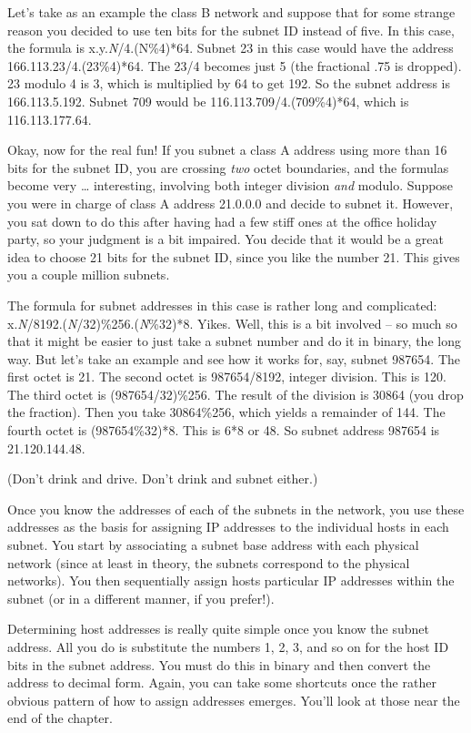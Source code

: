 \documentclass[b5paper,11pt]{memoir}
\begin{document}
Let's take as an example the class B network and suppose that for some
strange reason you decided to use ten bits for the subnet ID instead of
five. In this case, the formula is x.y.{\emph{N}}/4.(N\%4)*64. Subnet 23
in this case would have the address 166.113.23/4.(23\%4)*64. The 23/4
becomes just 5 (the fractional .75 is dropped). 23 modulo 4 is 3, which
is multiplied by 64 to get 192. So the subnet address is 166.113.5.192.
Subnet 709 would be 116.113.709/4.(709\%4)*64, which is 116.113.177.64.

Okay, now for the real fun! If you subnet a class A address using more
than 16 bits for the subnet ID, you are crossing {\emph{two}} octet
boundaries, and the formulas become very \ldots{} interesting, involving
both integer division {\emph{and}} modulo. Suppose you were in charge of
class A address 21.0.0.0 and decide to subnet it. However, you sat down
to do this after having had a few stiff ones at the office holiday
party, so your judgment is a bit impaired. You decide that it would be a
great idea to choose 21 bits for the subnet ID, since you like the
number 21. This gives you a couple million subnets.

The formula for subnet addresses in this case is rather long and
complicated: x.{\emph{N}}/8192.({\emph{N}}/32)\%256.({\emph{N}}\%32)*8.
Yikes. Well, this is a bit involved -- so much so that it might be easier
to just take a subnet number and do it in binary, the long way. But
let's take an example and see how it works for, say, subnet 987654. The
first octet is 21. The second octet is 987654/8192, integer division.
This is 120. The third octet is (987654/32)\%256. The result of the
division is 30864 (you drop the fraction). Then you take 30864\%256,
which yields a remainder of 144. The fourth octet is (987654\%32)*8.
This is 6*8 or 48. So subnet address 987654 is 21.120.144.48.

(Don't drink and drive. Don't drink and subnet either.)

\protect\hypertarget{ch19s05.html}{}{}

Once you know the addresses of each of the subnets in the network, you
use these addresses as the basis for assigning IP addresses to the
individual hosts in each subnet. You start by associating a subnet base
address with each physical network (since at least in theory, the
subnets correspond to the physical networks). You then sequentially
assign hosts particular IP addresses within the subnet (or in a
different manner, if you prefer!).

Determining host addresses is really quite simple once you know the
subnet address. All you do is substitute the numbers 1, 2, 3, and so on
for the host ID bits in the subnet address. You must do this in binary
and then convert the address to decimal form. Again, you can take some
shortcuts once the rather obvious pattern of how to assign addresses
emerges. You'll look at those near the end of the chapter.
\end{document}

